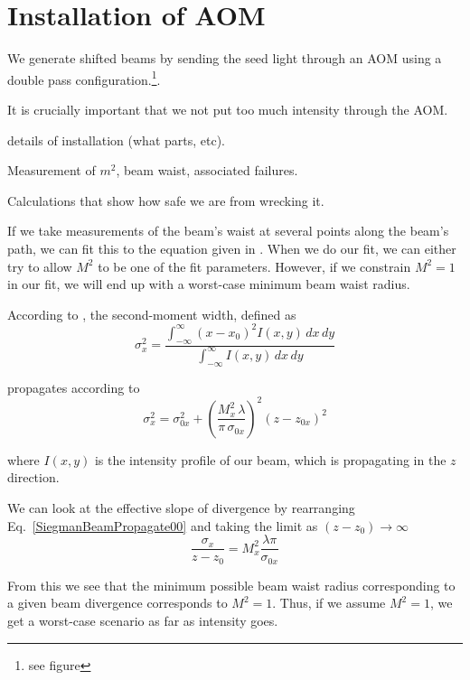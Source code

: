 \section{Installation of AOM}

We generate shifted beams by sending the seed light through an AOM using a double pass configuration.\footnote{see figure}. 

It is crucially important that we not put too much intensity through the AOM. 

details of installation (what parts, etc). 

Measurement of $m^2$, beam waist, associated failures. 

Calculations that show how safe we are from wrecking it. 


If we take measurements of the beam's waist at several points along the beam's path, we can fit this to the equation given in \cite{SiegmanBeamQuality}. When we do our fit, we can either try to allow $M^2$ to be one of the fit parameters. However, if we constrain $M^2=1$ in our fit, we will end up with a worst-case minimum beam waist radius. 

According to \cite{SiegmanBeamQuality}, the second-moment width, defined as 
\begin{equation}
\sigma_x^2=\frac{\int_{-\infty}^{\infty} (x-x_0)^2 I(x,y)\, dx\, dy}{\int_{-\infty}^{\infty} I(x,y)\, dx \, dy}
\end{equation} 

propagates according to 
\begin{equation}
\sigma_x^2=\sigma_{0x}^2+\left( \frac{M_x^2 \,\lambda}{\pi \, \sigma_{0x}}\right)^2 (z-z_{0x})^2 \label{SiegmanBeamPropagate00}
\end{equation}
 
where $I(x,y)$ is the intensity profile of our beam, which is propagating in the $z$ direction. 

We can look at the effective slope of divergence by rearranging Eq.\ \ref{SiegmanBeamPropagate00} and taking the limit as $(z-z_0) \rightarrow \infty$
\begin{equation}
\frac{\sigma_x}{z-z_0}=M_x^2 \frac{\lambda \pi}{\sigma_{0x}} \label{SiegmanBeamSlope}
\end{equation}

From this we see that the minimum possible beam waist radius corresponding to a given beam divergence corresponds to $M^2=1$. Thus, if we assume $M^2=1$, we get a worst-case scenario as far as intensity goes. 

